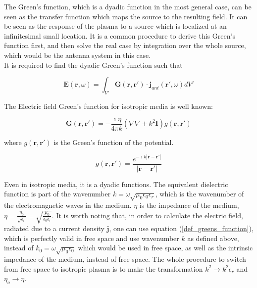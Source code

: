 \documentclass[a4paper,11pt]{article}
\begin{document}
The Green's function, which is a dyadic function in the most general case, can be seen as the transfer function which maps the source to the resulting field. It can be seen as the response of the plasma to a source which is localized at an infinitesimal small location. It is a common procedure to derive this Green's function first, and then solve the real case by integration over the whole source, which would be the antenna system in this case.\\

 It is required to find the dyadic Green's function such that

\begin{equation}
    \mathbf{E}(\mathbf{r},\omega)=\int_{V'} \mathbf{G}(\mathbf{r},\mathbf{r'})\cdot \mathbf{j}_{ant}(\mathbf{r'},\omega) dV'\label{def_greens_function}
\end{equation}

The Electric field Green's function for isotropic media is well known:

\begin{equation}
 \mathbf{G}(\mathbf{r},\mathbf{r'}) = -\frac{\imath \eta }{4 \pi k} \left(  \nabla  \nabla   + k^2  \mathbf{I} \right) g(\mathbf{r},\mathbf{r'})
\end{equation}

where $g(\mathbf{r},\mathbf{r'})$ is the Green's function of the potential.

\begin{equation}\label{eq:greens_func_vac}
    g(\mathbf{r},\mathbf{r'})= \frac{e^{- \imath k  | \mathbf{r}-\mathbf{r'} |}}{| \mathbf{r}-\mathbf{r'} |}
\end{equation}

Even in isotropic media, it is a dyadic functions. The equivalent dielectric function is part of the wavenumber $k=\omega \sqrt{\mu_0 \epsilon_0 \epsilon_r}$, which is the wavenumber of the electromagnetic waves in the medium. $\eta$ is the impedance of the medium, $\eta=\frac{\eta_0}{\sqrt{\epsilon_r}}=\sqrt{\frac{\mu_0}{\epsilon_0\epsilon_r}}$. It is worth noting that, in order to calculate the electric field, radiated due to a current density $\mathbf{j}$, one can use equation (\ref{def_greens_function}), which is perfectly valid in free space and use wavenumber $k$ as defined above, instead of $k_0=\omega \sqrt{\mu_0 \epsilon_0}$ which would be used in free space, as well as the intrinsic impedance of the medium, instead of free space. The whole procedure to switch from free space to isotropic plasma is to make the transformation $k^2 \rightarrow k^2\epsilon_r$ and $\eta_o \rightarrow \eta$.\\
\end{document}
